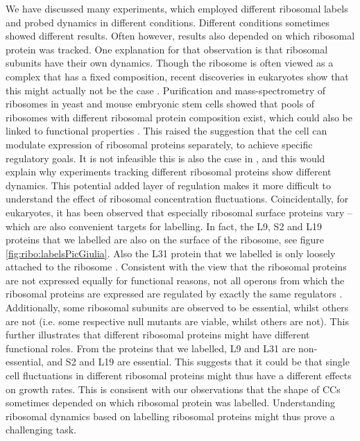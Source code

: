 We have discussed many experiments, which employed different ribosomal labels and probed dynamics in different conditions.
%
Different conditions sometimes showed different results.
%
Often however, results also depended on which ribosomal protein was tracked.
%
One explanation for that observation is that ribosomal subunits have their own dynamics.
%
Though the ribosome is often viewed as a complex that has a fixed composition, 
recent discoveries in eukaryotes show that this might actually not be the case \cite{Preiss2016, Slavov2015}.
%
Purification and mass-spectrometry of ribosomes in yeast and mouse embryonic stem cells showed that 
pools of ribosomes with different ribosomal protein composition exist, which could also be linked to functional properties \cite{Slavov2015}.
%
This raised the suggestion that the cell can modulate expression of ribosomal proteins separately, 
to achieve specific regulatory goals.
%
It is not infeasible this is also the case in \ecoli, and this would explain why experiments tracking different ribosomal proteins show different dynamics.
%
This potential added layer of regulation makes it more difficult to understand the effect of ribosomal concentration fluctuations.
Coincidentally, for eukaryotes, it has been observed that especially ribosomal surface proteins vary -- which are also convenient targets for labelling.
In fact, the L9, S2 and L19 proteins that we  labelled are also on the surface of the ribosome, see figure \ref{fig:ribo:labelsPicGiulia}.
Also the L31 protein that we labelled is only loosely attached to the ribosome \cite{Walker2016t}.
%
Consistent with the view that the ribosomal proteins are not expressed equally for functional reasons, 
not all operons from which the ribosomal proteins are expressed are regulated by exactly the same regulators \cite{Keseler2017}.
%
Additionally, some ribosomal subunits are observed to be essential, whilst others are not (i.e. some respective null mutants are viable, whilst others are not).
This further illustrates that different ribosomal proteins might have different functional roles.
%
From the proteins that we labelled, L9 and L31 are non-essential, and S2 and L19 are essential.
%
This suggests that it could be that 
single cell fluctuations in different ribosomal proteins might thus have a different effects on growth rates.
%
This is consisent with our observations that the shape of CCs sometimes depended on which ribosomal protein was labelled.
%
Understanding ribosomal dynamics based on labelling ribosomal proteins might thus prove a challenging task.

